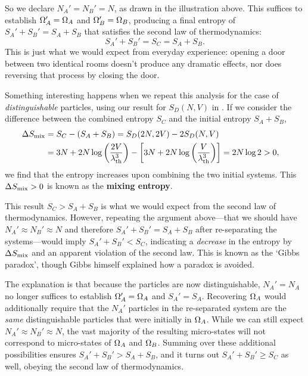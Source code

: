 So we declare $N_A' = N_B' = N$, as drawn in the illustration above.
This suffices to establish $\Omega_A' = \Omega_A$ and $\Omega_B' = \Omega_B$, producing a final entropy of $S_A' + S_B' = S_A + S_B$ that satisfies the second law of thermodynamics:
\begin{equation*}
  S_A' + S_B' = S_C = S_A + S_B.
\end{equation*}
This is just what we would expect from everyday experience: opening a door between two identical rooms doesn't produce any dramatic effects, nor does reversing that process by closing the door.

Something interesting happens when we repeat this analysis for the case of \textit{distinguishable} particles, using our result for $S_D(N, V)$ in .
If we consider the difference between the combined entropy $S_C$ and the initial entropy $S_A + S_B$,
\begin{align}
  \Delta S_{\mathrm{mix}} & = S_C - (S_A + S_B) = S_D(2N, 2V) - 2S_D(N, V) \cr
                       & = 3N + 2N \log\left(\frac{2V}{\lambda_{\mathrm{th}}^3}\right) - \left[3N + 2N \log\left(\frac{V}{\lambda_{\mathrm{th}}^3}\right)\right] = 2N\log 2 > 0, \label{eq:mixing_entropy}
\end{align}
we find that the entropy increases upon combining the two initial systems.
This $\Delta S_{\mathrm{mix}} > 0$ is known as the \textbf{mixing entropy}.

This result $S_C > S_A + S_B$ is what we would expect from the second law of thermodynamics.
However, repeating the argument above---that we should have $N_A' \approx N_B' \approx N$ and therefore $S_A' + S_B' = S_A + S_B$ after re-separating the systems---would imply $S_A' + S_B' < S_C$, indicating a \textit{decrease} in the entropy by $\Delta S_{\mathrm{mix}}$ and an apparent violation of the second law.
This is known as the `Gibbs paradox', though Gibbs himself explained how a paradox is avoided.

The explanation is that because the particles are now distinguishable, $N_A' = N_A$ no longer suffices to establish $\Omega_A' = \Omega_A$ and $S_A' = S_A$.
Recovering $\Omega_A$ would additionally require that the $N_A'$ particles in the re-separated system are the \emph{same} distinguishable particles that were initially in $\Omega_A$.
While we can still expect $N_A' \approx N_B' \approx N$, the vast majority of the resulting micro-states will not correspond to micro-states of $\Omega_A$ and $\Omega_B$.
Summing over these additional possibilities ensures $S_A' + S_B' > S_A + S_B$, and it turns out $S_A' + S_B' \geq S_C$ as well, obeying the second law of thermodynamics.

